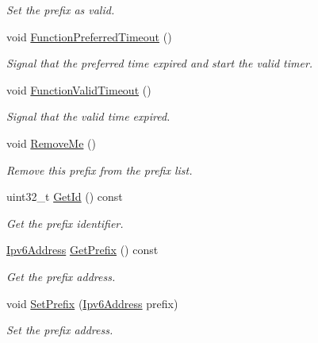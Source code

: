 \begin{DoxyCompactItemize}
\begin{DoxyCompactList}\small\item\em Set the prefix as valid. \end{DoxyCompactList}\item 
void \hyperlink{classns3_1_1Ipv6AutoconfiguredPrefix_a810cfbf6b8348052eafcf609c38f934f}{Function\+Preferred\+Timeout} ()
\begin{DoxyCompactList}\small\item\em Signal that the preferred time expired and start the valid timer. \end{DoxyCompactList}\item 
void \hyperlink{classns3_1_1Ipv6AutoconfiguredPrefix_a2453add67fb461e76a9f7506e47360b4}{Function\+Valid\+Timeout} ()
\begin{DoxyCompactList}\small\item\em Signal that the valid time expired. \end{DoxyCompactList}\item 
void \hyperlink{classns3_1_1Ipv6AutoconfiguredPrefix_a4362ad20dd2482b2c4e3b9d7d1580a51}{Remove\+Me} ()
\begin{DoxyCompactList}\small\item\em Remove this prefix from the prefix list. \end{DoxyCompactList}\item 
uint32\+\_\+t \hyperlink{classns3_1_1Ipv6AutoconfiguredPrefix_a99c89ebc3daa22019b1645d87201be9b}{Get\+Id} () const 
\begin{DoxyCompactList}\small\item\em Get the prefix identifier. \end{DoxyCompactList}\item 
\hyperlink{classns3_1_1Ipv6Address}{Ipv6\+Address} \hyperlink{classns3_1_1Ipv6AutoconfiguredPrefix_a0f6aa837135b33844d8d04be591462f7}{Get\+Prefix} () const 
\begin{DoxyCompactList}\small\item\em Get the prefix address. \end{DoxyCompactList}\item 
void \hyperlink{classns3_1_1Ipv6AutoconfiguredPrefix_a89e395ddb2a23f9d5dc6f0c1a436a8be}{Set\+Prefix} (\hyperlink{classns3_1_1Ipv6Address}{Ipv6\+Address} prefix)
\begin{DoxyCompactList}\small\item\em Set the prefix address. \end{DoxyCompactList}\item 

\end{DoxyCompactItemize}
